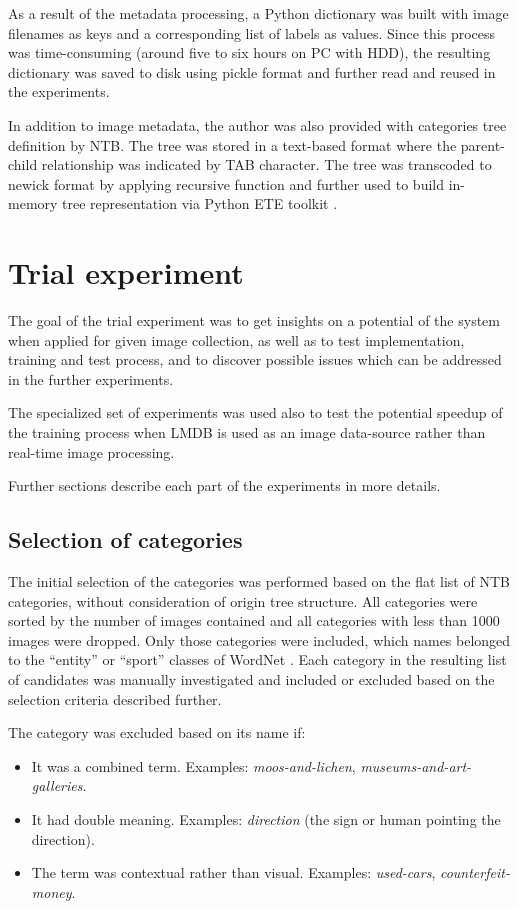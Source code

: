 As a result of the metadata processing, a Python dictionary was built with image filenames as keys and a corresponding list of labels as values. Since this process was time-consuming (around five to six hours on PC with HDD), the resulting dictionary was saved to disk using pickle \cite{pickle} format and further read and reused in the experiments.

In addition to image metadata, the author was also provided with categories tree definition by NTB. The tree was stored in a text-based format where the parent-child relationship was indicated by TAB character. The tree was transcoded to newick \cite{newick} format by applying recursive function and further used to build in-memory tree representation via Python ETE toolkit \cite{ete3}.


\section{Trial experiment}
    The goal of the trial experiment was to get insights on a potential of the system when applied for given image collection, as well as to test implementation, training and test process, and to discover possible issues which can be addressed in the further experiments.
    
    The specialized set of experiments was used also to test the potential speedup of the training process when LMDB is used as an image data-source rather than real-time image processing.
    
    Further sections describe each part of the experiments in more details.
    
    \subsection{Selection of categories}
    The initial selection of the categories was performed based on the flat list of NTB categories, without consideration of origin tree structure. All categories were sorted by the number of images contained and all categories with less than 1000 images were dropped. Only those categories were included, which names belonged to the ``entity'' or ``sport'' classes of WordNet \cite{wordnet}. Each category in the resulting list of candidates was manually investigated and included or excluded based on the selection criteria described further.
    
    The category was excluded based on its name if:
    \begin{itemize}
        \item It was a combined term. Examples: \textit{moos-and-lichen}, \textit{museums-and-art-galleries}.
        \item It had double meaning. Examples: \textit{direction} (the sign or human pointing the direction).
        \item The term was contextual rather than visual. Examples: \textit{used-cars}, \textit{counterfeit-money}.
    \end{itemize}
    
